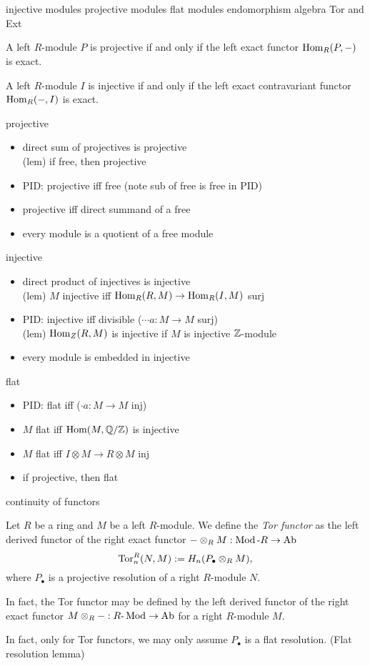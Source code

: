 \documentclass{../../large}
\begin{document}
\section{}
injective modules
projective modules
flat modules
endomorphism algebra
Tor and Ext


A left $R$-module $P$ is projective if and only if the left exact functor $\operatorname{Hom}_R(P,-)$ is exact.

A left $R$-module $I$ is injective if and only if the left exact contravariant functor $\operatorname{Hom}_R(-,I)$ is exact.


projective
\begin{itemize}
\item direct sum of projectives is projective
    \\(lem) if free, then projective
\item PID: projective iff free (note sub of free is free in PID)
\item projective iff direct summand of a free
\item every module is a quotient of a free module
\end{itemize}

injective
\begin{itemize}
\item direct product of injectives is injective
    \\(lem) $M$ injective iff $\operatorname{Hom}_R(R,M)\to\operatorname{Hom}_R(I,M)$ surj
\item PID: injective iff divisible ($\cdots a:M\to M$ surj)
    \\(lem) $\operatorname{Hom}_Z(R,M)$ is injective if $M$ is injective $\mathbb{Z}$-module
\item every module is embedded in injective
\end{itemize}

flat
\begin{itemize}
\item PID: flat iff ($\cdot a:M\to M$ inj)
\item $M$ flat iff $\operatorname{Hom}(M,\mathbb{Q}/\mathbb{Z})$ is injective
\item $M$ flat iff $I\otimes M\to R\otimes M$ inj
\item if projective, then flat
\end{itemize}

continuity of functors

\begin{prb}
Let $R$ be a ring and $M$ be a left $R$-module.
We define the \emph{Tor functor} as the left derived functor of the right exact functor $-\otimes_RM:\operatorname{Mod}\text{-}R\to\mathrm{Ab}$
\[\operatorname{Tor}_n^R(N,M):=H_n(P_\bullet\otimes_RM),\]
where $P_\bullet$ is a projective resolution of a right $R$-module $N$.
\begin{parts}
\item In fact, the Tor functor may be defined by the left derived functor of the right exact functor $M\otimes_R-:R\text{-}\operatorname{Mod}\to\mathrm{Ab}$ for a right $R$-module $M$.
\item In fact, only for Tor functors, we may only assume $P_\bullet$ is a flat resolution. (Flat resolution lemma)
\end{parts}
\end{prb}
\end{document}
